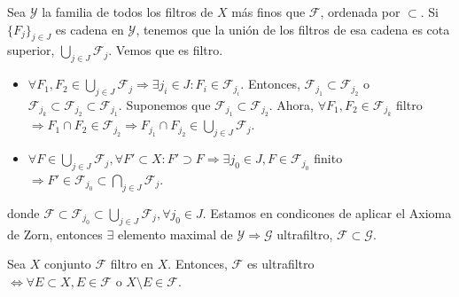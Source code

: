 \begin{dem}
  Sea $\mathcal{Y}$ la familia de todos los filtros de $X$ más finos que $\mathcal{F}$, ordenada por $\subset$. Si $\{ F_{j} \}_{j \in J}$ es cadena en $\mathcal{Y}$, tenemos que la unión de los filtros de esa cadena es cota superior, $\bigcup_{j \in J} \mathcal{F}_{j}$. Vemos que es filtro.
  \begin{itemize}
    \item $\forall F_{1}, F_{2} \in \bigcup_{j \in J} \mathcal{F}_{j} \Rightarrow \exists j_{i} \in J : F_{i} \in \mathcal{F}_{j_{i}}$. Entonces, $\mathcal{F}_{j_{1}} \subset \mathcal{F}_{j_{2}}$ o $\mathcal{F}_{j_{k}} \subset \mathcal{F}_{j_{2}} \subset \mathcal{F}_{j_{1}}$. Suponemos que $\mathcal{F}_{j_{1}} \subset \mathcal{F}_{j_{2}}$. Ahora, $\forall F_{1}, F_{2} \in \mathcal{F}_{j_{k}}$ filtro $\Rightarrow F_{1} \cap F_{2} \in \mathcal{F}_{j_{2}} \Rightarrow F_{j_{1}} \cap F_{j_{2}} \in \bigcup_{j \in J} \mathcal{F}_{j}$.
    \item $\forall F \in \bigcup_{j \in J} \mathcal{F}_{j}, \forall F' \subset X : F' \supset F \Rightarrow \exists j_{0} \in J, F \in \mathcal{F}_{j_{0}} $ finito $\Rightarrow F' \in \mathcal{F}_{j_{0}} \subset \bigcap_{j \in J} \mathcal{F}_{j}$.
  \end{itemize}
  donde $\mathcal{F} \subset \mathcal{F}_{j_{0}} \subset \bigcup_{j \in J} \mathcal{F}_{j}, \forall j_{0} \in J$. Estamos en condicones de aplicar el Axioma de Zorn, entonces $\exists$ elemento maximal de $\mathcal{Y} \Rightarrow \mathcal{G}$ ultrafiltro, $\mathcal{F} \subset \mathcal{G}$.
\end{dem}

\begin{prop}
  Sea $X$ conjunto $\mathcal{F}$ filtro en $X$. Entonces, $\mathcal{F}$ es ultrafiltro $\Leftrightarrow \forall E \subset X, E \in \mathcal{F} \text{ o } X \setminus E \in \mathcal{F}$.
\end{prop}

